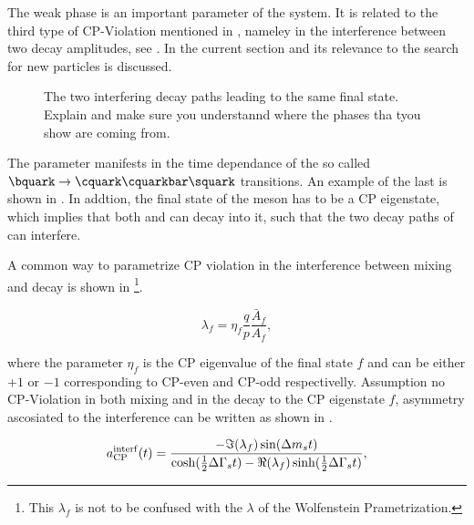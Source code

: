 The weak phase \phis is an important parameter of the \BBbarSyst system. It is related to the third
type of CP-Violation mentioned in , nameley in the interference between
two decay amplitudes, see . In the current section \phis and its relevance to
the search for new particles is discussed.

\newcommand{\ffig}{f}
\newcommand{\phimixfig}{\phi_\text{mix}}
\newcommand{\phifig}{\phi_\text{dec}}
\newcommand{\phibarfig}{\kern 0.15em \overline{\kern -0.15em \phi_\text{dec} \kern -0.60em} \kern 0.60em}
\begin{figure}[h]
  \centering
  \resizebox{0.4\textwidth}{!}{}
  \caption{The two interfering decay paths leading to the same final state.
  {\color{red} Explain and make sure you understannd where the phases tha tyou show are coming from.}           }
  \label{interference}
\end{figure}

The parameter \phis manifests in the time dependance of the so called $\bquark \rightarrow \cquark\cquarkbar\squark $ transitions.
An example of the last is shown in . In addtion, the final state of the \Bs meson has to be
a CP eigenstate, which implies that both \Bs and \Bsb can decay into it, such that the two decay paths
of  can interfere.

A common way to parametrize CP violation in the interference between mixing and decay is shown in 
\footnote{This $\lambda_f$ is not to be confused with the $\lambda$ of the Wolfenstein Prametrization.}.

\begin{equation}
 \lambda_{f} = \eta_f \frac{q}{p} \frac{\bar{A}_f}{A_f}, %
\label{lambda_cpv}
\end{equation}

\noindent where the parameter $\eta_f$ is the CP eigenvalue of the final state $f$ and can be either $+1$ or $-1$
corresponding to CP-even and CP-odd respectivelly. Assumption no CP-Violation in both \BBbarSyst mixing and in the
decay to the CP eigenstate $f$, asymmetry ascosiated to the interference can be written as shown in .

\newcommand{\half}{\frac{1}{2}}
\begin{equation}
  a_{\rm CP}^{\rm interf}(t) = \frac{ - \Im(\lambda_f) \sin(\Delta m_s t)} {\cosh(\half \Delta\Gamma_s t) - \Re(\lambda_f)\sinh(\half\Delta\Gamma_s t)},
\label{cpv_interf}
\end{equation}

